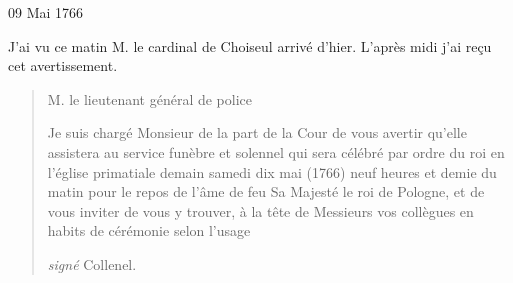                      \begin{diary}{09 Mai 1766}{}

                         J'ai vu ce matin M.
                              le cardinal de Choiseul
                           arrivé d'hier. L'après midi j'ai reçu cet
                           avertissement. \bigskip


                        \begin{quote}M. le lieutenant
                                    général de police\bigskip


                              Je suis chargé Monsieur de la part de la Cour
                              de vous avertir qu'elle assistera au service funèbre et solennel
                              qui sera célébré par ordre
                              du roi en l’église primatiale
                              demain samedi
                                 dix mai (1766) neuf heures et demie du matin
                              pour le repos de l'âme de feu Sa Majesté le roi de Pologne,
                              et de vous inviter de vous y trouver, à la tête de
                              Messieurs vos collègues en habits de cérémonie selon
                              l'usage \bigskip

        \begin{flushright}\emph{signé}
                                 Collenel.\end{flushright}\end{quote}
                     \end{diary}

